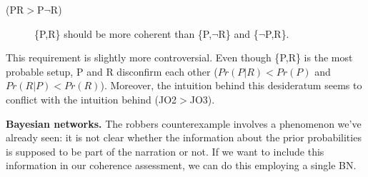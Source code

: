 \documentclass[
  10pt,
]{scrartcl}
\newcommand{\s}[1]{\textsf{#1}}
\begin{document}
\begin{description}
    \item[(\s{PR}$>$\s{P}$\neg$\s{R})] \{\s{P,R}\} should be more coherent than \{\s{P},$\neg$\s{R}\} and \{$\neg$\s{P},\s{R}\}.
\end{description}\vspace{2mm}

\noindent  This requirement is slightly more controversial. Even though \{\s{P,R}\} is the most probable setup, \s{P} and \s{R} disconfirm each other (\(Pr(P|R)<Pr(P)\) and \(Pr(R|P)<Pr(R)\)). Moreover, the intuition behind this desideratum seems to conflict with the intuition behind (\s{JO2}\(>\)\s{JO3}).

\textbf{Bayesian networks.} The robbers counterexample involves a phenomenon we've already seen: it is not clear whether the information about the prior probabilities is supposed to be part of the narration or not.  If we want to include this information in our coherence assessment, we can do this employing a single BN.

\vspace{1mm}
\footnotesize

\normalsize
\end{document}
